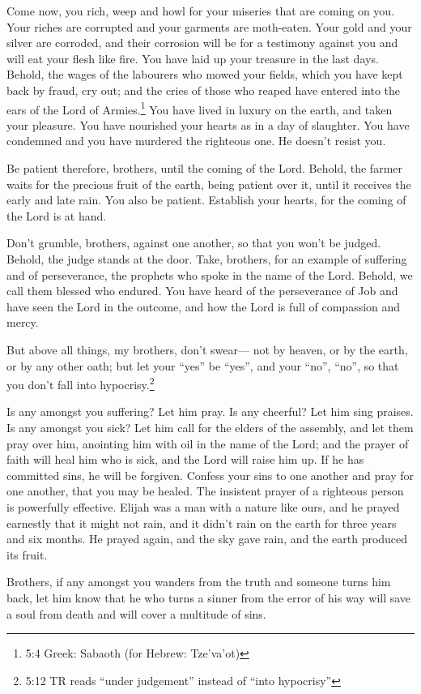  Come now, you rich, weep and howl for your miseries that
are coming on you.  Your riches are corrupted and your
garments are moth-eaten.  Your gold and your silver are
corroded, and their corrosion will be for a testimony against you and
will eat your flesh like fire. You have laid up your treasure in the
last days.  Behold, the wages of the labourers who mowed
your fields, which you have kept back by fraud, cry out; and the cries
of those who reaped have entered into the ears of the Lord of
Armies.\footnote{5:4 Greek: Sabaoth (for Hebrew: Tze'va'ot)}
 You have lived in luxury on the earth, and taken your
pleasure. You have nourished your hearts as in a day of slaughter.
 You have condemned and you have murdered the righteous one.
He doesn't resist you.

 Be patient therefore, brothers, until the coming of the
Lord. Behold, the farmer waits for the precious fruit of the earth,
being patient over it, until it receives the early and late rain.
 You also be patient. Establish your hearts, for the coming
of the Lord is at hand.

 Don't grumble, brothers, against one another, so that you
won't be judged. Behold, the judge stands at the door. 
Take, brothers, for an example of suffering and of perseverance, the
prophets who spoke in the name of the Lord.  Behold, we
call them blessed who endured. You have heard of the perseverance of Job
and have seen the Lord in the outcome, and how the Lord is full of
compassion and mercy.

 But above all things, my brothers, don't swear--- not by
heaven, or by the earth, or by any other oath; but let your ``yes'' be
``yes'', and your ``no'', ``no'', so that you don't fall into
hypocrisy.\footnote{5:12 TR reads ``under judgement'' instead of ``into
  hypocrisy''}

 Is any amongst you suffering? Let him pray. Is any
cheerful? Let him sing praises.  Is any amongst you sick?
Let him call for the elders of the assembly, and let them pray over him,
anointing him with oil in the name of the Lord;  and the
prayer of faith will heal him who is sick, and the Lord will raise him
up. If he has committed sins, he will be forgiven.  Confess
your sins to one another and pray for one another, that you may be
healed. The insistent prayer of a righteous person is powerfully
effective.  Elijah was a man with a nature like ours, and
he prayed earnestly that it might not rain, and it didn't rain on the
earth for three years and six months.  He prayed again, and
the sky gave rain, and the earth produced its fruit.

 Brothers, if any amongst you wanders from the truth and
someone turns him back,  let him know that he who turns a
sinner from the error of his way will save a soul from death and will
cover a multitude of sins.
